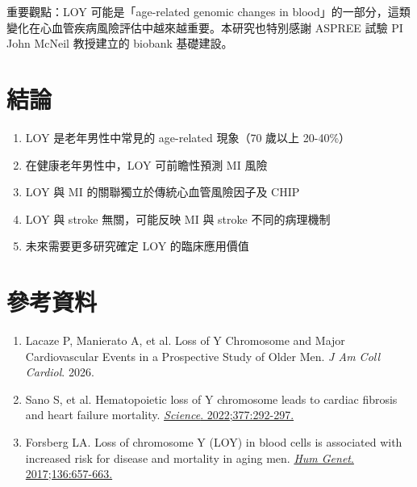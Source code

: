 \documentclass[12pt,a4paper]{article}
\newcommand{\note}[1]{
    \par
    \noindent
    \begin{tcolorbox}[
        colback=emergency_blue!5!white,
        colframe=emergency_blue,
        title=\textbf{重點提醒},
        fonttitle=\bfseries,
        boxrule=0.5pt,
        arc=3pt,
        left=6pt,
        right=6pt,
        top=6pt,
        bottom=6pt
    ]
    #1
    \end{tcolorbox}
}
\begin{document}
\note{
重要觀點：LOY 可能是「age-related genomic changes in blood」的一部分，這類變化在心血管疾病風險評估中越來越重要。本研究也特別感謝 ASPREE 試驗 PI John McNeil 教授建立的 biobank 基礎建設。
}

\section{結論}

\begin{enumerate}
    \item LOY 是老年男性中常見的 age-related 現象（70 歲以上 20-40\%）
    \item 在健康老年男性中，LOY 可前瞻性預測 MI 風險
    \item LOY 與 MI 的關聯獨立於傳統心血管風險因子及 CHIP
    \item LOY 與 stroke 無關，可能反映 MI 與 stroke 不同的病理機制
    \item 未來需要更多研究確定 LOY 的臨床應用價值
\end{enumerate}

\section{參考資料}

\begin{enumerate}
    \item Lacaze P, Manierato A, et al. Loss of Y Chromosome and Major Cardiovascular Events in a Prospective Study of Older Men. \textit{J Am Coll Cardiol}. 2026.
    \item Sano S, et al. Hematopoietic loss of Y chromosome leads to cardiac fibrosis and heart failure mortality. \href{https://doi.org/10.1126/science.abn3100}{\textit{Science}. 2022;377:292-297.}
    \item Forsberg LA. Loss of chromosome Y (LOY) in blood cells is associated with increased risk for disease and mortality in aging men. \href{https://doi.org/10.1007/s00439-017-1799-2}{\textit{Hum Genet}. 2017;136:657-663.}
\end{enumerate}
\end{document}
